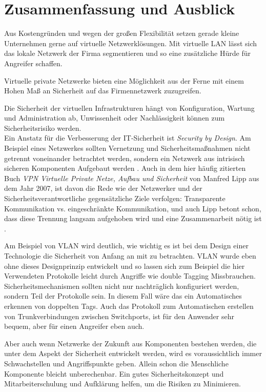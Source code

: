 \chapter{Zusammenfassung und Ausblick}

Aus Kostengründen und wegen der großen Flexibilität setzen gerade kleine Unternehmen gerne auf virtuelle Netzwerklösungen. Mit virtuelle LAN lässt sich das lokale Netzwerk der Firma segmentieren und so eine zusätzliche Hürde für Angreifer schaffen.

Virtuelle private Netzwerke bieten eine Möglichkeit aus der Ferne mit einem Hohen Maß an Sicherheit auf das Firmennetzwerk zuzugreifen. 

Die Sicherheit der virtuellen Infrastrukturen hängt von Konfiguration, Wartung und Administration ab, Unwissenheit oder Nachlässigkeit können zum Sicherheitsrisiko werden. \\   

Ein Anstatz für die Verbesserung der IT-Sicherheit ist \emph{Security by Design}. Am Beispiel eines Netzwerkes sollten Vernetzung und Sicherheitsmaßnahmen nicht getrennt voneinander betrachtet werden, sondern ein Netzwerk aus intrisisch sicheren Komponenten Aufgebaut werden \cite{nicholson2018blurring}. Auch in dem hier häufig zitierten Buch \emph{VPN Virtuelle Private Netze, Aufbau und Sicherheit} von Manfred Lipp aus dem Jahr 2007, ist davon die Rede wie der Netzwerker und der Sicherheitsverantwortliche gegensätzliche Ziele verfolgen: Transparente Kommunikation vs. eingeschränkte Kommunikation, und auch Lipp betont schon, dass diese Trennung langsam aufgehoben wird und eine Zusammenarbeit nötig ist \cite{lipp2007vpn}. 

Am Beispiel von VLAN wird deutlich, wie wichtig es ist bei dem Design einer Technologie die Sicherheit von Anfang an mit zu betrachten. VLAN wurde eben ohne dieses Designprinzip entwickelt und so lassen sich zum Beispiel die hier Verwendeten Protokolle leicht durch Angriffe wie double Tagging Missbrauchen. Sicherheitsmechanismen sollten nicht nur nachträglich konfiguriert werden, sondern Teil der Protokolle sein. In diesem Fall wäre das ein Automatisches erkennen von doppelten Tags. Auch das Protokoll zum Automatischen erstellen von Trunkverbindungen zwischen Switchports, ist für den Anwender sehr bequem, aber für einen Angreifer eben auch. 

Aber auch wenn Netzwerke der Zukunft aus Komponenten bestehen werden, die unter dem Aspekt der Sicherheit entwickelt werden, %
wird es voraussichtlich immer Schwachstellen und Angriffspunkte geben. Allein schon die Menschliche Komponente bleicht unberechenbar. Ein gutes Sicherheitskonzept und Mitarbeiterschulung und Aufklärung helfen, um die Risiken zu Minimieren.